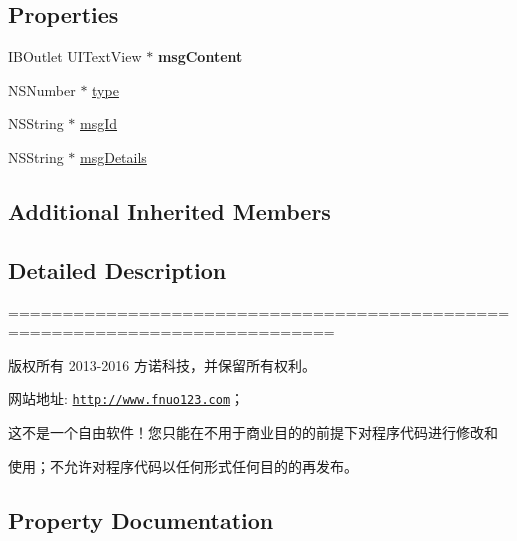 \subsection*{Properties}
\begin{DoxyCompactItemize}
\item 
\mbox{\label{interface_msg_detail_view_controller_ab28222fca6fee279d1395fa4ce64b4fe}} 
I\+B\+Outlet U\+I\+Text\+View $\ast$ {\bfseries msg\+Content}
\item 
N\+S\+Number $\ast$ \mbox{\hyperlink{interface_msg_detail_view_controller_a18ef4a25c358124cb4d98c378afd13d8}{type}}
\item 
N\+S\+String $\ast$ \mbox{\hyperlink{interface_msg_detail_view_controller_a4ac8f4c2dd1c34fda76c3a5c5a96383d}{msg\+Id}}
\item 
N\+S\+String $\ast$ \mbox{\hyperlink{interface_msg_detail_view_controller_a97311ac99a82334e8b047f7fe08321ef}{msg\+Details}}
\end{DoxyCompactItemize}
\subsection*{Additional Inherited Members}


\subsection{Detailed Description}
============================================================================

版权所有 2013-\/2016 方诺科技，并保留所有权利。

网站地址\+: \href{http://www.fnuo123.com}{\tt http\+://www.\+fnuo123.\+com}； 



这不是一个自由软件！您只能在不用于商业目的的前提下对程序代码进行修改和

使用；不允许对程序代码以任何形式任何目的的再发布。 

 

\subsection{Property Documentation}
\mbox{\label{interface_msg_detail_view_controller_a97311ac99a82334e8b047f7fe08321ef}} 
